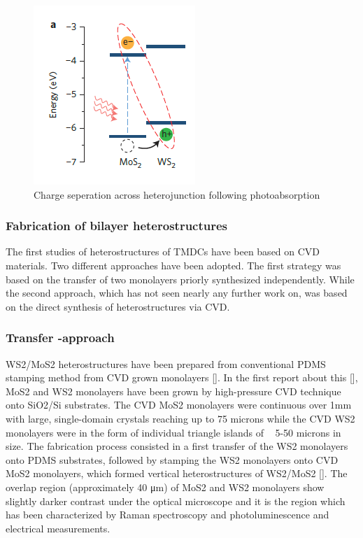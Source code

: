 \begin{figure}[h]
	\begin{center}
		\includegraphics[scale=1]{Heterostructures/HeterostructureChargeSeparationDiagram.png}
		\caption{Charge seperation across heterojunction following photoabsorption}
		\label{fig:HeterostructuresChargeSeperationDiagram}
	\end{center}
\end{figure}

\subsubsection{Fabrication of bilayer heterostructures}

The first studies of heterostructures of TMDCs have been based on CVD materials. Two different approaches have been adopted. The first strategy was based on the transfer of two monolayers priorly synthesized independently.  While the second approach, which has not seen nearly any further work on, was based on the direct synthesis of heterostructures via CVD. 

\subsubsection{Transfer -approach}

WS2/MoS2 heterostructures have been prepared from conventional PDMS stamping method from CVD grown monolayers []. In the first report about this [], MoS2 and WS2 monolayers have been grown by high-pressure CVD technique onto SiO2/Si substrates. The CVD MoS2 monolayers were continuous over 1mm with large, single-domain crystals reaching up to 75 microns while the CVD WS2 monolayers were in the form of individual triangle islands of ~ 5-50 microns in size. 
The fabrication process consisted in a first transfer of the WS2 monolayers onto PDMS substrates, followed by stamping the WS2 monolayers onto CVD MoS2 monolayers, which formed vertical heterostructures of WS2/MoS2 []. The overlap region (approximately 40 μm) of MoS2 and WS2 monolayers show slightly darker contrast under the optical microscope and it is the region which has been characterized by Raman spectroscopy and photoluminescence and electrical measurements.

